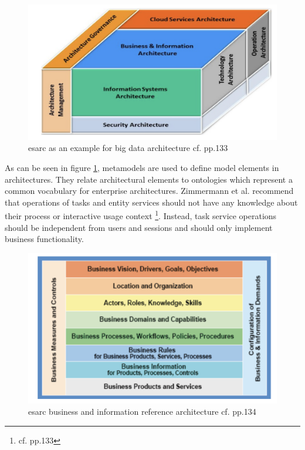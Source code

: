 \begin{figure}[htbp]
	\centering
	\includegraphics[width=1\textwidth]{images/esarc_cube.png}
	\caption{\ac{esarc} as an example for big data architecture cf.\autocite{zimmermann} pp.133}
	\label{esarc_example}
\end{figure}

As can be seen in figure \ref{esarc_example}, metamodels are used to define model elements in architectures. They relate architectural elements to ontologies which represent a common vocabulary for enterprise architectures.
Zimmermann et al. recommend that operations of tasks and entity services should not have any knowledge about their process or interactive usage context \footnote{cf.\autocite{zimmermann} pp.133}. Instead, task service operations should be independent from users and sessions and should only implement business functionality.

\begin{figure}[htbp]
	\centering
	\includegraphics[width=1\textwidth]{images/esarc_business.png}
	\caption{\ac{esarc} business and information reference architecture cf.\autocite{zimmermann} pp.134}
	\label{vp_architecture}
\end{figure}

